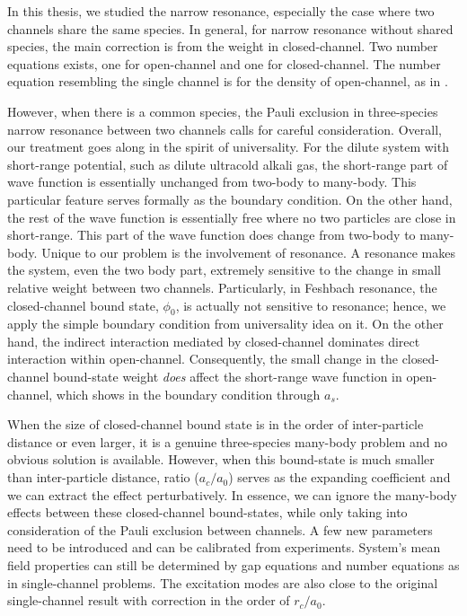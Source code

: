 % 
In this thesis, we studied the narrow resonance, especially the case where two channels share the same species.  In general, for narrow resonance without shared species, the main correction is from the weight in closed-channel.  Two number equations exists, one for open-channel and one for closed-channel.  The number equation resembling the single channel is for the density of open-channel, as in  \cite{GurarieNarrow}.  

However, when there is a common species,  the Pauli exclusion in three-species narrow resonance between two channels calls for careful  consideration.  Overall, our treatment goes along in the spirit of universality.  For the dilute system with short-range potential, such as dilute ultracold alkali gas, the short-range part of  wave function is essentially unchanged from two-body  to many-body.  This particular feature serves formally as the boundary condition.  On the other hand, the rest of the wave function is essentially free where no two particles are close in short-range. This part of the wave function does change from two-body to many-body.  Unique to our problem is the involvement of resonance.  A resonance makes the system, even the two body part, extremely sensitive to the change in small relative weight between two channels. Particularly, in Feshbach resonance, the closed-channel bound state, $\phi_{0}$,  is actually not sensitive to resonance; hence, we apply the simple boundary condition from universality idea on it. On the other hand, the indirect interaction mediated by closed-channel dominates direct interaction within open-channel. Consequently, the small change in the closed-channel bound-state weight \emph{does} affect the short-range wave function in open-channel, which shows in the boundary condition through $a_{s}$. 

When the size of  closed-channel bound state is in the order of   inter-particle distance or even larger, it is a genuine three-species many-body problem and no obvious solution is available.  However, when this bound-state is much smaller than inter-particle distance, ratio ($a_{c}/a_{0}$) serves as the expanding coefficient and we can extract  the effect perturbatively.  In essence, we can ignore the many-body effects between these closed-channel bound-states, while only taking into consideration of the Pauli exclusion between channels.  A few new parameters need to be introduced and can be calibrated from experiments.  System's mean field properties can still be determined by gap equations and number equations as in single-channel problems.  The excitation modes are also close to the original single-channel result with correction in the order of $r_{c}/a_{0}$.

